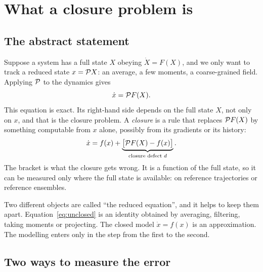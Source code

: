 \section{What a closure problem is}
\label{sec:problem}

\subsection{The abstract statement}

Suppose a system has a full state $X$ obeying $\dot X = F(X)$, and we only
want to track a reduced state $x = \mathcal{P} X$: an average, a few moments, a
coarse-grained field. Applying $\mathcal{P}$ to the dynamics gives
\begin{equation}
  \dot x = \mathcal{P} F(X).
  \label{eq:unclosed}
\end{equation}
This equation is exact. Its right-hand side depends on the full state $X$,
not only on $x$, and that is the closure problem. A \emph{closure} is a rule
that replaces $\mathcal{P} F(X)$ by something computable from $x$ alone, possibly
from its gradients or its history:
\begin{equation}
  \dot x = f(x) + \underbrace{\bigl[\mathcal{P} F(X) - f(x)\bigr]}_{\text{closure defect } d} .
  \label{eq:defect}
\end{equation}
The bracket is what the closure gets wrong. It is a function of the full
state, so it can be measured only where the full state is available: on
reference trajectories or reference ensembles.

Two different objects are called ``the reduced equation'', and it helps to
keep them apart. Equation~\eqref{eq:unclosed} is an identity obtained by
averaging, filtering, taking moments or projecting. The closed model
$\dot x = f(x)$ is an approximation. The modelling enters only in the step
from the first to the second.

\subsection{Two ways to measure the error}

